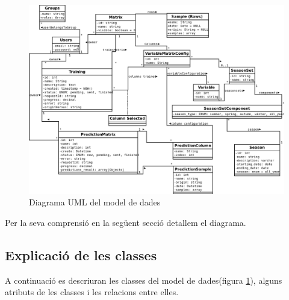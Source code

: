\begin{figure}
  \includegraphics[scale=0.5]{img/specification/ModelClass.png}
  \caption{Diagrama UML del model de dades}
  \label{fig:datamodel}
\end{figure}

Per la seva comprensió en la següent secció detallem el diagrama.


\subsection{Explicaci\'{o} de les classes}
A continuaci\'{o} es descriuran les classes del model de dades(figura \ref{fig:datamodel}), alguns atributs de les classes i les relacions entre elles.

